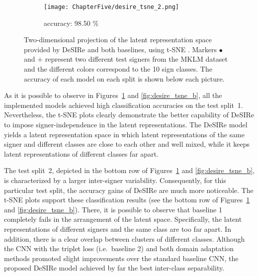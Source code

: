 \begin{figure}[ht!]
\begin{minipage}[t!]{0.985\textwidth}
\begin{subfigure}{0.325\textwidth}
            \centering
            \texttt{[image: ChapterFive/desire\_tsne\_2.png]}
            \caption{accuracy: 98.50 \%}
        \end{subfigure}
    \end{minipage}
    \caption{Two-dimensional projection of the latent representation space provided by DeSIRe and both baselines, using t-SNE \cite{Maaten2008}. Markers $\bullet$ and $\textbf{+}$ represent two different test signers from the MKLM dataset and the different colors correspond to the 10 sign classes. The accuracy of each model on each split is shown below each picture.}
    \label{fig:desire_tsne_a}
\end{figure}

As it is possible to observe in Figures~\ref{fig:desire_tsne_a} and \ref{fig:desire_tsne_b}, all the implemented models achieved high classification accuracies on the test split~1. Nevertheless, the t-SNE plots clearly demonstrate the better capability of DeSIRe to impose signer-independence in the latent representations. The DeSIRe model yields a latent representation space in which latent representations of the same signer and different classes are close to each other and well mixed, while it keeps latent representations of different classes far apart.

The test split~2, depicted in the bottom row of Figures~\ref{fig:desire_tsne_a} and \ref{fig:desire_tsne_b}, is characterized by a larger inter-signer variability. Consequently, for this particular test split, the accuracy gains of DeSIRe are much more noticeable. The t-SNE plots support these classification results (see the bottom row of Figures~\ref{fig:desire_tsne_a} and \ref{fig:desire_tsne_b}). There, it is possible to observe that baseline 1 completely fails in the arrangement of the latent space. Specifically, the latent representations of different signers and the same class are too far apart. In addition, there is a clear overlap between clusters of different classes. Although the CNN with the triplet loss (i.e.\ baseline 2) and both domain adaptation methods promoted slight improvements over the standard baseline CNN, the proposed DeSIRe model achieved by far the best inter-class separability.

